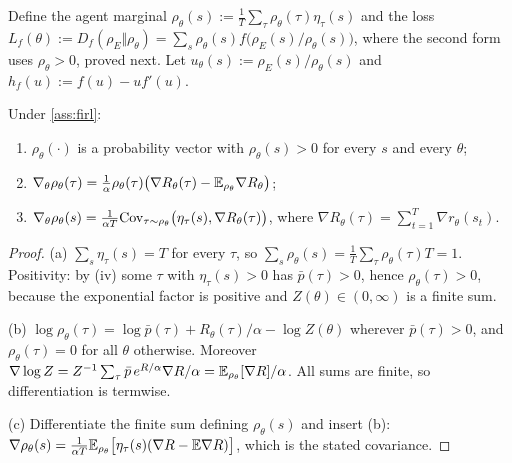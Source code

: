 Define the agent marginal $\rho_\theta(s):=\frac1T\sum_\tau\rho_\theta(\tau)\eta_\tau(s)$ and the loss
$L_f(\theta):=D_f(\rho_E\Vert\rho_\theta)=\sum_s\rho_\theta(s)f\big(\rho_E(s)/\rho_\theta(s)\big)$, where the second form uses $\rho_\theta>0$, proved next.
Let $u_\theta(s):=\rho_E(s)/\rho_\theta(s)$ and $h_f(u):=f(u)-uf'(u)$.

\begin{lemma}\label{lem:firl-basic}
Under \cref{ass:firl}:
\begin{enumerate}[nosep,label=(\alph*)]
\item $\rho_\theta(\cdot)$ is a probability vector with $\rho_\theta(s)>0$ for every $s$ and every $\theta$;
\item $\nabla_\theta\rho_\theta(\tau)=\frac1\alpha\rho_\theta(\tau)\big(\nabla R_\theta(\tau)-\mathbb{E}_{\rho_\theta}\nabla R_\theta\big)$;
\item $\nabla_\theta\rho_\theta(s)=\frac1{\alpha T}\mathrm{Cov}_{\tau\sim\rho_\theta}\big(\eta_\tau(s),\nabla R_\theta(\tau)\big)$, where $\nabla R_\theta(\tau)=\sum_{t=1}^T\nabla r_\theta(s_t)$.
\end{enumerate}
\end{lemma}
\begin{proof}
(a) $\sum_s\eta_\tau(s)=T$ for every $\tau$, so $\sum_s\rho_\theta(s)=\frac1T\sum_\tau\rho_\theta(\tau)T=1$.
Positivity: by (iv) some $\tau$ with $\eta_\tau(s)>0$ has $\bar p(\tau)>0$, hence $\rho_\theta(\tau)>0$, because the exponential factor is positive and $Z(\theta)\in(0,\infty)$ is a finite sum.

(b) $\log\rho_\theta(\tau)=\log\bar p(\tau)+R_\theta(\tau)/\alpha-\log Z(\theta)$ wherever $\bar p(\tau)>0$, and $\rho_\theta(\tau)=0$ for all $\theta$ otherwise.
Moreover $\nabla\log Z=Z^{-1}\sum_\tau\bar p\,e^{R/\alpha}\nabla R/\alpha=\mathbb{E}_{\rho_\theta}[\nabla R]/\alpha$.
All sums are finite, so differentiation is termwise.

(c) Differentiate the finite sum defining $\rho_\theta(s)$ and insert (b):
$\nabla\rho_\theta(s)=\frac1{\alpha T}\mathbb{E}_{\rho_\theta}\big[\eta_\tau(s)(\nabla R-\mathbb{E}\nabla R)\big]$, which is the stated covariance.
\end{proof}

